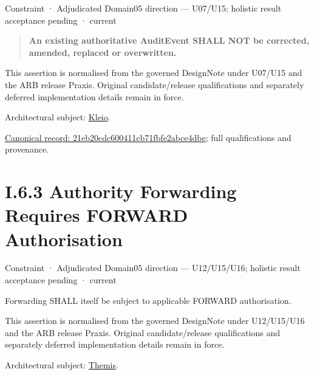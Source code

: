 \label{element:21eb20cdc600411cb71fbfe2abce4dbe}
{\small Constraint · Adjudicated Domain05 direction — U07/U15; holistic result acceptance pending · current}\par

\begin{quote}


\textbf{An existing authoritative AuditEvent SHALL NOT be corrected, amended, replaced or overwritten.}



\end{quote}


This assertion is normalised from the governed DesignNote under U07/U15 and the ARB release Praxis. Original candidate/release qualifications and separately deferred implementation details remain in force.



Architectural subject: \hyperref[element:fefda110e2274884ad58906733606efd]{Kleio}.


{\footnotesize \href{../../../../../../../../continuum/motivation/constraint/21eb20cdc600411cb71fbfe2abce4dbe.md}{Canonical record: 21eb20cdc600411cb71fbfe2abce4dbe}; full qualifications and provenance.}\par
\section*{I.6.3 Authority Forwarding Requires FORWARD Authorisation}
\label{navigation:I.6.3}

\label{element:5aed12f6540445ed85c1866adbef93af}
{\small Constraint · Adjudicated Domain05 direction — U12/U15/U16; holistic result acceptance pending · current}\par

Forwarding SHALL itself be subject to applicable FORWARD authorisation.



This assertion is normalised from the governed DesignNote under U12/U15/U16 and the ARB release Praxis. Original candidate/release qualifications and separately deferred implementation details remain in force.



Architectural subject: \hyperref[element:899d34ec491948b68aad09e507dea6d1]{Themis}.


